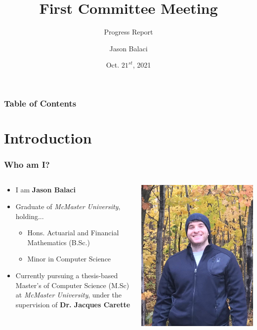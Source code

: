 \documentclass{beamer}
\title[Committee Meeting 1]{First Committee Meeting}
\subtitle{Progress Report}
\author{Jason Balaci}
\institute{McMaster University}
\date{Oct. $21^{st}$, 2021}
\begin{document}
\frame{\titlepage}

\begin{frame}
\frametitle{Table of Contents}
\tableofcontents
\end{frame}

\section{Introduction}
\begin{frame}
    \frametitle{Who am I?}
    \begin{columns}[T,onlytextwidth]
        \begin{column}{.5\textwidth}
            \begin{minipage}{\textwidth}
                \begin{itemize}
                    \item<1-> I am \textbf{Jason Balaci}
                    \item<2-> Graduate of \emph{McMaster University}, holding...
                        \begin{itemize}
                            \item<3-> Hons. Actuarial and Financial Mathematics (B.Sc.)
                            \item<4-> Minor in Computer Science
                        \end{itemize}
                    \item<5-> Currently pursuing a thesis-based Master's of Computer Science (M.Sc) at \emph{McMaster University}, under the supervision of \textbf{Dr. Jacques Carette}
                \end{itemize}
            \end{minipage}
        \end{column}
        \begin{column}{.45\textwidth}
            \includegraphics[width=.8\textwidth]{me.jpeg}

\end{column}
\end{columns}
\end{frame}
\end{document}
